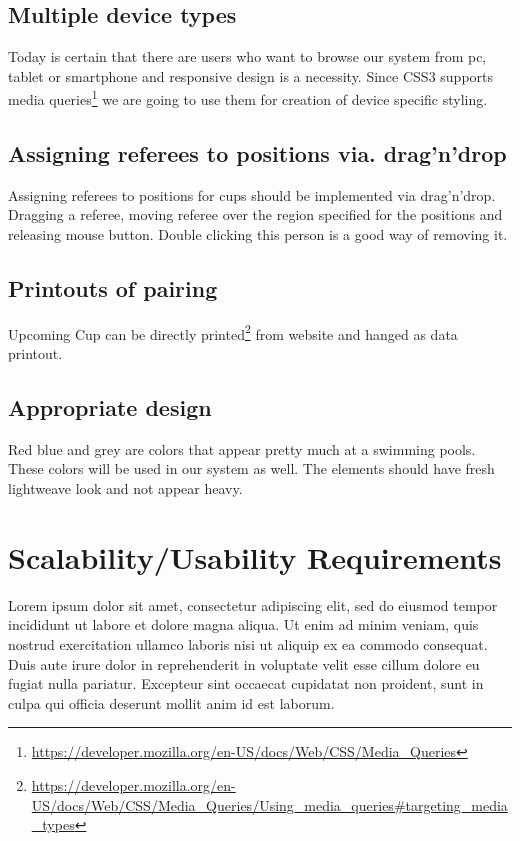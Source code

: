 \subsection*{Multiple device types}
\par
Today is certain that there are users who want to browse our system from pc, tablet or smartphone and responsive design is a necessity. Since CSS3 supports media queries\footnote{\url{https://developer.mozilla.org/en-US/docs/Web/CSS/Media_Queries}} we are going to use them for creation of device specific styling.
\subsection*{Assigning referees to positions via. drag'n'drop}
\par
Assigning referees to positions for cups should be implemented via drag'n'drop. Dragging a referee, moving referee over the region specified for the positions and releasing mouse button. Double clicking this person is a good way of removing it.
\subsection*{Printouts of pairing}
Upcoming Cup can be directly printed\footnote{\url{https://developer.mozilla.org/en-US/docs/Web/CSS/Media_Queries/Using_media_queries\#targeting_media_types}} from website and hanged as data printout. 
\subsection*{Appropriate design}
\par
Red blue and grey are colors that appear pretty much at a swimming pools. These colors will be used in our system as well. The elements should have fresh lightweave look and not appear heavy.
\section{Scalability/Usability Requirements}
Lorem ipsum dolor sit amet, consectetur adipiscing elit, sed do eiusmod tempor incididunt ut labore et dolore magna aliqua. Ut enim ad minim veniam, quis nostrud exercitation ullamco laboris nisi ut aliquip ex ea commodo consequat. Duis aute irure dolor in reprehenderit in voluptate velit esse cillum dolore eu fugiat nulla pariatur. Excepteur sint occaecat cupidatat non proident, sunt in culpa qui officia deserunt mollit anim id est laborum.